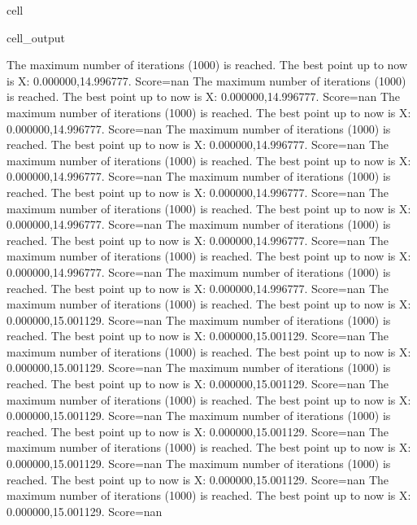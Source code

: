 \documentclass[letterpaper,10pt,english]{jupyterBook}
\begin{document}
\begin{sphinxuseclass}{cell}
\begin{sphinxVerbatimOutput}
\begin{sphinxuseclass}{cell_output}
\begin{sphinxVerbatim}[commandchars=\\\{\}]
The maximum number of iterations (1000) is reached. The best point up to now is X: \PYGZob{}0.000000,14.996777\PYGZcb{}. Score=\PYGZhy{}nan
The maximum number of iterations (1000) is reached. The best point up to now is X: \PYGZob{}0.000000,14.996777\PYGZcb{}. Score=\PYGZhy{}nan
The maximum number of iterations (1000) is reached. The best point up to now is X: \PYGZob{}0.000000,14.996777\PYGZcb{}. Score=\PYGZhy{}nan
The maximum number of iterations (1000) is reached. The best point up to now is X: \PYGZob{}0.000000,14.996777\PYGZcb{}. Score=\PYGZhy{}nan
The maximum number of iterations (1000) is reached. The best point up to now is X: \PYGZob{}0.000000,14.996777\PYGZcb{}. Score=\PYGZhy{}nan
The maximum number of iterations (1000) is reached. The best point up to now is X: \PYGZob{}0.000000,14.996777\PYGZcb{}. Score=\PYGZhy{}nan
The maximum number of iterations (1000) is reached. The best point up to now is X: \PYGZob{}0.000000,14.996777\PYGZcb{}. Score=\PYGZhy{}nan
The maximum number of iterations (1000) is reached. The best point up to now is X: \PYGZob{}0.000000,14.996777\PYGZcb{}. Score=\PYGZhy{}nan
The maximum number of iterations (1000) is reached. The best point up to now is X: \PYGZob{}0.000000,14.996777\PYGZcb{}. Score=\PYGZhy{}nan
The maximum number of iterations (1000) is reached. The best point up to now is X: \PYGZob{}0.000000,14.996777\PYGZcb{}. Score=\PYGZhy{}nan
The maximum number of iterations (1000) is reached. The best point up to now is X: \PYGZob{}0.000000,15.001129\PYGZcb{}. Score=\PYGZhy{}nan
The maximum number of iterations (1000) is reached. The best point up to now is X: \PYGZob{}0.000000,15.001129\PYGZcb{}. Score=\PYGZhy{}nan
The maximum number of iterations (1000) is reached. The best point up to now is X: \PYGZob{}0.000000,15.001129\PYGZcb{}. Score=\PYGZhy{}nan
The maximum number of iterations (1000) is reached. The best point up to now is X: \PYGZob{}0.000000,15.001129\PYGZcb{}. Score=\PYGZhy{}nan
The maximum number of iterations (1000) is reached. The best point up to now is X: \PYGZob{}0.000000,15.001129\PYGZcb{}. Score=\PYGZhy{}nan
The maximum number of iterations (1000) is reached. The best point up to now is X: \PYGZob{}0.000000,15.001129\PYGZcb{}. Score=\PYGZhy{}nan
The maximum number of iterations (1000) is reached. The best point up to now is X: \PYGZob{}0.000000,15.001129\PYGZcb{}. Score=\PYGZhy{}nan
The maximum number of iterations (1000) is reached. The best point up to now is X: \PYGZob{}0.000000,15.001129\PYGZcb{}. Score=\PYGZhy{}nan
The maximum number of iterations (1000) is reached. The best point up to now is X: \PYGZob{}0.000000,15.001129\PYGZcb{}. Score=\PYGZhy{}nan

\end{sphinxVerbatim}
\end{sphinxuseclass}
\end{sphinxVerbatimOutput}
\end{sphinxuseclass}
\end{document}
